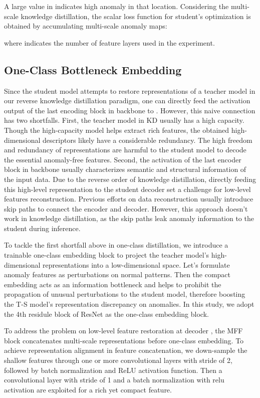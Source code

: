 \documentclass[10pt,twocolumn,letterpaper]{article}
\begin{document}
A large value in  indicates high anomaly in that location. Considering the multi-scale knowledge distillation, the scalar loss function for student's optimization is obtained by accumulating multi-scale anomaly maps:

where  indicates the number of feature layers used in the experiment.

\subsection{One-Class Bottleneck Embedding}
\label{subsec:oce}

Since the student model  attempts to restore representations of a teacher model  in our reverse knowledge distillation paradigm, one can directly feed the activation output of the last encoding block in backbone to . However, this naive connection has two shortfalls. First, the teacher model in KD usually has a high capacity. Though the high-capacity model helps extract rich features, the obtained high-dimensional descriptors likely have a considerable redundancy. The high freedom and redundancy of representations are harmful to the student model to decode the essential anomaly-free features. Second, the activation of the last encoder block in backbone usually characterizes semantic and structural information of the input data. Due to the reverse order of knowledge distillation, directly feeding this high-level representation to the student decoder set a challenge for low-level features reconstruction. Previous efforts on data reconstruction usually introduce skip paths to connect the encoder and decoder. However, this approach doesn't work in knowledge distillation, as the skip paths leak anomaly information to the student during inference.

To tackle the first shortfall above in one-class distillation, we introduce a trainable one-class embedding block to project the teacher model's high-dimensional representations into a low-dimensional space. Let's formulate anomaly features as perturbations on normal patterns. Then the compact embedding acts as an information bottleneck and helps to prohibit the propagation of unusual perturbations to the student model, therefore boosting the T-S model's representation discrepancy on anomalies. In this study, we adopt the 4th residule block of ResNet \cite{He_2016_CVPR} as the one-class embedding block.

To address the problem on low-level feature restoration at decoder , the MFF block concatenates multi-scale representations before one-class embedding. To achieve representation alignment in feature concatenation, we down-sample the shallow features through one or more  convolutional layers with stride of 2, followed by batch normalization and ReLU activation function. Then a  convolutional layer with stride of 1 and a batch normalization with relu activation are exploited for a rich yet compact feature.
\end{document}
